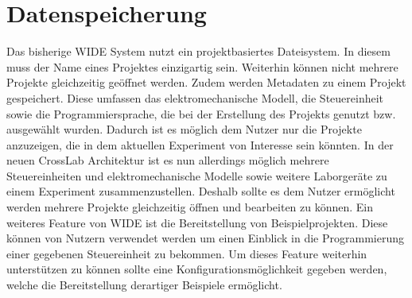 \section{Datenspeicherung} \label{konzeption:datenspeicherung}

Das bisherige WIDE System nutzt ein projektbasiertes Dateisystem. In diesem muss der Name eines Projektes einzigartig sein. Weiterhin können nicht mehrere Projekte gleichzeitig geöffnet werden. Zudem werden Metadaten zu einem Projekt gespeichert. Diese umfassen das elektromechanische Modell, die Steuereinheit sowie die Programmiersprache, die bei der Erstellung des Projekts genutzt bzw. ausgewählt wurden. Dadurch ist es möglich dem Nutzer nur die Projekte anzuzeigen, die in dem aktuellen Experiment von Interesse sein könnten. In der neuen CrossLab Architektur ist es nun allerdings möglich mehrere Steuereinheiten und elektromechanische Modelle sowie weitere Laborgeräte zu einem Experiment zusammenzustellen. Deshalb sollte es dem Nutzer ermöglicht werden mehrere Projekte gleichzeitig öffnen und bearbeiten zu können. Ein weiteres Feature von WIDE ist die Bereitstellung von Beispielprojekten. Diese können von Nutzern verwendet werden um einen Einblick in die Programmierung einer gegebenen Steuereinheit zu bekommen. Um dieses Feature weiterhin unterstützen zu können sollte eine Konfigurationsmöglichkeit gegeben werden, welche die Bereitstellung derartiger Beispiele ermöglicht.